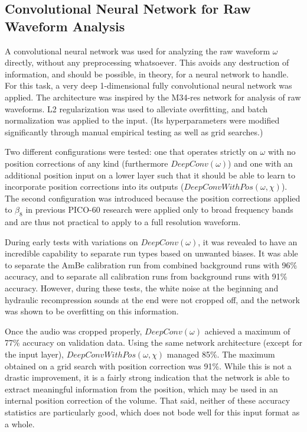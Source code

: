 \documentclass[10pt]{article}
\begin{document}
\subsection{Convolutional Neural Network for Raw Waveform Analysis}

A convolutional neural network was used for analyzing the raw waveform $\omega$ directly, without any preprocessing whatsoever. This avoids any destruction of information, and should be possible, in theory, for a neural network to handle. For this task, a very deep 1-dimensional fully convolutional neural network was applied. The architecture was inspired by the M34-res network \cite{verydeepconvnets} for analysis of raw waveforms. L2 regularization was used to alleviate overfitting, and batch normalization was applied to the input. (Its hyperparameters were modified significantly through manual empirical testing as well as grid searches.)

Two different configurations were tested: one that operates strictly on $\omega$ with no position corrections of any kind (furthermore $DeepConv(\omega)$) and one with an additional position input on a lower layer such that it should be able to learn to incorporate position corrections into its outputs ($DeepConvWithPos(\omega, \chi)$). The second configuration was introduced because the position corrections applied to $\beta_{8}$ in previous PICO-60 research were applied only to broad frequency bands and are thus not practical to apply to a full resolution waveform.

During early tests with variations on $DeepConv(\omega)$, it was revealed to have an incredible capability to separate run types based on unwanted biases. It was able to separate the AmBe calibration run from combined background runs with 96\% accuracy, and to separate all calibration runs from background runs with 91\% accuracy. However, during these tests, the white noise at the beginning and hydraulic recompression sounds at the end were not cropped off, and the network was shown to be overfitting on this information.

Once the audio was cropped properly, $DeepConv(\omega)$ achieved a maximum of 77\% accuracy on validation data. Using the same network architecture (except for the input layer), $DeepConvWithPos(\omega, \chi)$ managed 85\%. The maximum obtained on a grid search with position correction was 91\%. While this is not a drastic improvement, it is a fairly strong indication that the network is able to extract meaningful information from the position, which may be used in an internal position correction of the volume. That said, neither of these accuracy statistics are particularly good, which does not bode well for this input format as a whole.
\end{document}

